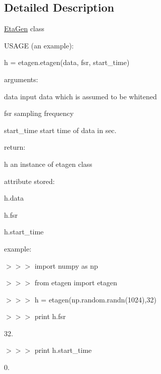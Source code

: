 \subsection{Detailed Description}
\hyperlink{namespaceEtaGen}{Eta\-Gen} class

U\-S\-A\-G\-E (an example)\-:\par
 h = etagen.\-etagen(data, fsr, start\-\_\-time)

arguments\-:\par
 data input data which is assumed to be whitened\par
 fsr sampling frequency\par
 start\-\_\-time start time of data in sec.

return\-:\par
 h an instance of etagen class\par


attribute stored\-:\par
 h.\-data\par
 h.\-fsr\par
 h.\-start\-\_\-time

example\-:\par
 $>$$>$$>$ import numpy as np

$>$$>$$>$ from etagen import etagen

$>$$>$$>$ h = etagen(np.\-random.\-randn(1024),32)

$>$$>$$>$ print h.\-fsr\par
 32.

$>$$>$$>$ print h.\-start\-\_\-time\par
 0. 

